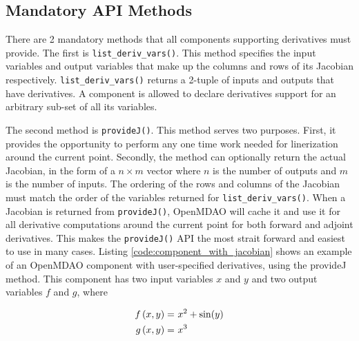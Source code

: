 \documentclass[]{aiaa-tc} %
\begin{document}
        \subsection{Mandatory API Methods}

        There are 2 mandatory methods that all components supporting derivatives must provide.
        The first is \texttt{list\_deriv\_vars()}. This method specifies the
        input variables and output variables that make up the columns and rows of its Jacobian respectively.
        \texttt{list\_deriv\_vars()} returns a 2-tuple of inputs and outputs that have derivatives.
        A component is allowed to declare derivatives support for an arbitrary sub-set of all its variables.

        The second method is \texttt{provideJ()}. This method serves two purposes. First, it provides the
        opportunity to perform any one time work needed for linerization around the current point. Secondly,
        the method can optionally return the actual Jacobian, in the form of a $n \times m$ vector where $n$ is the
        number of outputs and $m$ is the number of inputs. The ordering of the rows and columns of the Jacobian
        must match the order of the variables returned for \texttt{list\_deriv\_vars()}. When a Jacobian is
        returned from \texttt{provideJ()}, OpenMDAO will cache it and use it for all derivative computations
        around the current point for both forward and adjoint derivatives. This makes the \texttt{provideJ()}
        API the most strait forward and easiest to use in many cases. Listing \ref{code:component_with_jacobian} shows
        an example of an OpenMDAO component with user-specified derivatives, using the provideJ method.
        This component has two input variables $x$ and $y$ and two output variables $f$ and $g$, where

        \begin{align}
            f\left(x, y\right) =&\  x^2 + \sin(y) \\ \notag
            g\left(x, y\right) =&\  x^3
        \end{align}
\end{document}
